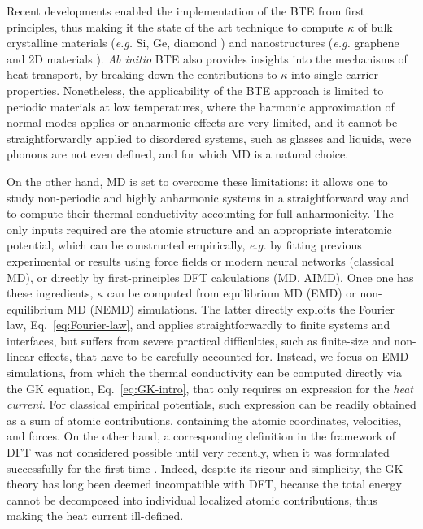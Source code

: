 Recent developments enabled the implementation of the BTE from first principles, thus making it the state of the art technique to compute $\kappa$ of bulk crystalline materials (\emph{e.g.} Si, Ge, diamond \cite{Broido:2007iu,Ward2009}) and nanostructures (\emph{e.g.} graphene and 2D materials \cite{Fugallo2014}). \emph{Ab initio} BTE also provides insights into the mechanisms of heat transport, by breaking down the contributions to $\kappa$ into single carrier properties. 
Nonetheless, the applicability of the BTE approach is limited to periodic materials at low temperatures, where the harmonic approximation of normal modes applies or anharmonic effects are very limited, and it cannot be straightforwardly applied to disordered systems, such as glasses and liquids, were phonons are not even defined, and for which MD is a natural choice. 

On the other hand, MD is set to overcome these limitations: it allows one to study non-periodic and highly anharmonic systems in a straightforward way and to compute their thermal conductivity accounting for full anharmonicity. The only inputs required are the atomic structure and an appropriate interatomic potential, which can be constructed empirically, \emph{e.g.} by fitting previous experimental or \abinitio results using force fields or modern neural networks (classical MD), or directly by first-principles DFT calculations (\abinitio MD, AIMD). 
Once one has these ingredients, $\kappa$ can be computed from equilibrium MD (EMD) or non-equilibrium MD (NEMD) simulations. The latter directly exploits the Fourier law, Eq.~\eqref{eq:Fourier-law}, and applies straightforwardly to finite systems and interfaces, but suffers from severe practical difficulties, such as finite-size and non-linear effects, that have to be carefully accounted for. 
Instead, we focus on EMD simulations, from which the thermal conductivity can be computed directly via the GK equation, Eq.~\eqref{eq:GK-intro}, that only requires an expression for the \emph{heat current}. 
For classical empirical potentials, such expression can be readily obtained as a sum of atomic contributions, containing the atomic coordinates, velocities, and forces. 
On the other hand, a corresponding definition in the framework of DFT was not considered possible until very recently, when it was formulated successfully for the first time \cite{Marcolongo2016}.
Indeed, despite its rigour and simplicity, the GK theory has long been deemed incompatible with DFT, because the total energy cannot be decomposed into individual localized atomic contributions, thus making the heat current ill-defined. 

